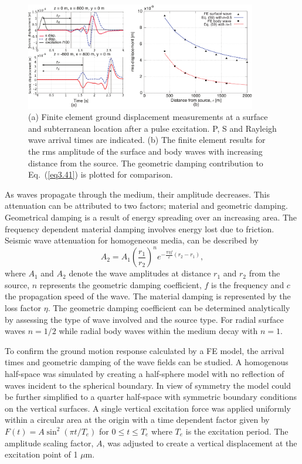 \begin{figure}[t] 
   	\begin{center}
   		\includegraphics[width=0.9\textwidth]{./Sec_SiteInfra/Figures/Check_surfbulk.pdf} 
 		 \caption{(a) Finite element ground displacement measurements at a surface and subterranean location after a pulse excitation. P, S and Rayleigh wave arrival times are indicated. (b) The finite element results for the rms amplitude of the surface and body waves with increasing distance from the source. The geometric damping contribution to Eq.~(\ref{eq3.41}) is plotted for comparison.}
 	 	\label{CheckGGN}
 	 \end{center}
\end{figure}

As waves propagate through the medium, their amplitude decreases. This attenuation can be attributed to two factors; material and geometric damping. Geometrical damping is a result of energy spreading over an increasing area. The frequency dependent material damping involves energy lost due to friction. Seismic wave attenuation for homogeneous media, can be described by~\cite{seismic_kim}
\begin{equation}
	A_2 = A_1\left(\frac{r_1}{r_2}\right)^n e^{-\frac{\pi \eta f}{c}(r_2-r_1)},
	\label{eq3.41}
\end{equation}
where $A_1$ and $A_2$ denote the wave amplitudes at distance $r_1$ and $r_2$ from the source, $n$ represents the geometric damping coefficient, $f$ is  the frequency and $c$ the propagation speed of the wave. The material damping is represented by the loss factor $\eta$. The geometric damping coefficient can be determined analytically by assessing the type of wave involved and the source type. For radial surface waves $n=1/2$ while radial body waves within the medium decay with $n=1$.

To confirm the ground motion response calculated by a FE model, the arrival times and geometric damping of the wave fields can be studied. A homogenous half-space was simulated by creating a half-sphere model with no reflection of waves incident to the spherical boundary. In view of symmetry the model could be further simplified to a quarter half-space with symmetric boundary conditions on the vertical surfaces. A single vertical excitation force was applied uniformly within a circular area at the origin with a time dependent factor given by $F(t) = A \sin^2( \pi t/T_e)$ for $0\leq t \leq T_e$ where $T_e$ is the excitation period. The amplitude scaling factor, $A$, was adjusted to create a vertical displacement at the excitation point of 1 $\mu$m.


